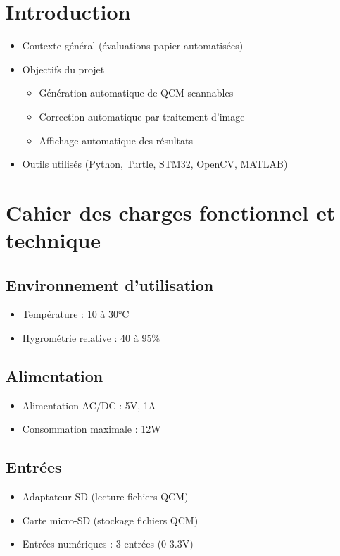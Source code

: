 \documentclass[a4paper,11pt]{article}
\begin{document}
\tableofcontents
\newpage

\section{Introduction}
\begin{itemize}
    \item Contexte général (évaluations papier automatisées)
    \item Objectifs du projet
    \begin{itemize}
        \item Génération automatique de QCM scannables
        \item Correction automatique par traitement d'image
        \item Affichage automatique des résultats
    \end{itemize}
    \item Outils utilisés (Python, Turtle, STM32, OpenCV, MATLAB)
\end{itemize}

\section{Cahier des charges fonctionnel et technique}

\subsection{Environnement d'utilisation}
\begin{itemize}
    \item Température : 10 à 30°C
    \item Hygrométrie relative : 40 à 95\%
\end{itemize}

\subsection{Alimentation}
\begin{itemize}
    \item Alimentation AC/DC : 5V, 1A
    \item Consommation maximale : 12W
\end{itemize}

\subsection{Entrées}
\begin{itemize}
    \item Adaptateur SD (lecture fichiers QCM)
    \item Carte micro-SD (stockage fichiers QCM)
    \item Entrées numériques : 3 entrées (0-3.3V)
\end{itemize}
\end{document}
